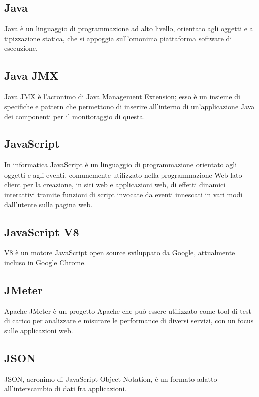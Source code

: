 
\subsection*{Java}
Java è un linguaggio di programmazione ad alto livello, orientato agli oggetti e a tipizzazione statica, che si appoggia sull'omonima piattaforma software di esecuzione.

\subsection*{Java JMX}
Java JMX è l'acronimo di Java Management Extension; esso è un insieme di specifiche e pattern che permettono di inserire all'interno di un'applicazione Java dei componenti per il monitoraggio di questa.

\subsection*{JavaScript}
In informatica JavaScript è un linguaggio di programmazione orientato agli oggetti e agli eventi, comunemente utilizzato nella programmazione Web lato client per la creazione, in siti web e applicazioni web, di effetti dinamici interattivi tramite funzioni di script invocate da eventi innescati in vari modi dall'utente sulla pagina web.

\subsection*{JavaScript V8}
V8 è un motore JavaScript open source sviluppato da Google, attualmente incluso in Google Chrome.

\subsection*{JMeter}
Apache JMeter è un progetto Apache che può essere utilizzato come tool di test di carico per analizzare e misurare le performance di diversi servizi, con un focus sulle applicazioni web.

\subsection*{JSON}
JSON, acronimo di JavaScript Object Notation, è un formato adatto all'interscambio di dati fra applicazioni.

